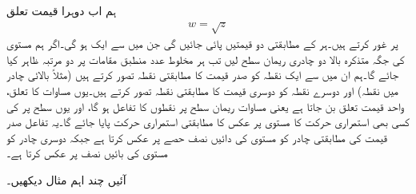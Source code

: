 ہم اب دوہرا قیمت تعلق
\begin{align}\label{مساوات_نقش_جذر_تفاعل_الف}
w=\sqrt{z}
\end{align} 
پر غور کرتے ہیں۔ہر  کے مطابقتی دو   قیمتیں پائی جائیں گی جن میں سے ایک  ہو گی۔اگر ہم  مستوی کی جگہ متذکرہ بالا دو چادری ریمان سطح  لیں تب ہر مخلوط عدد  منطبق مقامات پر دو مرتبہ ظاہر کیا جائے گا۔ہم ان میں سے ایک نقطہ کو صدر قیمت کا مطابقتی نقطہ  تصور کرتے ہیں (مثلاً بالائی چادر میں نقطہ) اور دوسرے نقطہ کو دوسری قیمت کا مطابقتی نقطہ تصور کرتے ہیں۔یوں مساوات  کا تعلق، واحد قیمت تعلق بن جاتا ہے یعنی مساوات  ریمان سطح پر نقطوں کا تفاعل ہو گا، اور یوں سطح پر  کی کسی بھی استمراری حرکت کا  مستوی پر عکس کا مطابقتی استمراری حرکت پایا جائے گا۔یہ تفاعل صدر قیمت کی مطابقتی چادر کو   مستوی کی دائیں نصف حصے پر  عکس کرتا ہے جبکہ دوسری چادر کو  مستوی کی بائیں نصف پر عکس کرتا ہے۔

آئیں چند اہم مثال دیکھیں۔


